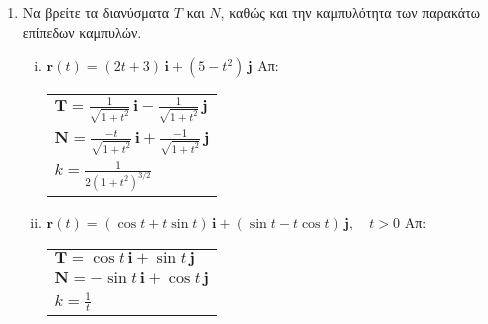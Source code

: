\begin{enumerate}
  \item Να βρείτε τα διανύσματα $ T $ και $N$, καθώς και την καμπυλότητα των παρακάτω 
    επίπεδων καμπυλών.
    \begin{enumerate}[i)]
      \item $ \mathbf{r}(t)=(2t+3)\, \mathbf{i} + (5-t^{2})\, \mathbf{j} $ 
        \hfill Απ: \begin{tabular}{l}
          $ \mathbf{T} =  \frac{1}{\sqrt{1+t^{2}}}\,\mathbf{i} -
          \frac{1}{\sqrt{1+t^{2}}}\,\mathbf{j} $
          \\
          $ \mathbf{N}=  \frac{-t}{\sqrt{1+t^{2}}}\,\mathbf{i} + 
          \frac{-1}{\sqrt{1+t^{2}}} \,\mathbf{j} $ \\
          $ k= \frac{1}{2(1+t^{2})^{3/2}} $ 
        \end{tabular} 
      \item $ \mathbf{r}(t)=(\cos{t} + t \sin{t})\, \mathbf{i} + (\sin{t} - t
        \cos{t})\, \mathbf{j} , \quad t>0 $
        \hfill Απ: \begin{tabular}{l}
          $ \mathbf{T}=  \cos{t}\,\mathbf{i} + \sin{t}\,\mathbf{j} $ \\
          $ \mathbf{N}=  - \sin{t}\,\mathbf{i} + \cos{t}\,\mathbf{j} $ \\
          $ k = \frac{1}{t} $
        \end{tabular} 
    \end{enumerate}


\end{enumerate}
